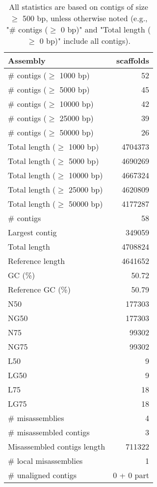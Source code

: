 \documentclass[12pt,a4paper]{article}
\begin{document}
\begin{table}[ht]
\begin{center}
\caption{All statistics are based on contigs of size $\geq$ 500 bp, unless otherwise noted (e.g., "\# contigs ($\geq$ 0 bp)" and "Total length ($\geq$ 0 bp)" include all contigs).}
\begin{tabular}{|l*{1}{|r}|}
\hline
Assembly & scaffolds \\ \hline
\# contigs ($\geq$ 1000 bp) & 52 \\ \hline
\# contigs ($\geq$ 5000 bp) & 45 \\ \hline
\# contigs ($\geq$ 10000 bp) & 42 \\ \hline
\# contigs ($\geq$ 25000 bp) & 39 \\ \hline
\# contigs ($\geq$ 50000 bp) & 26 \\ \hline
Total length ($\geq$ 1000 bp) & 4704373 \\ \hline
Total length ($\geq$ 5000 bp) & 4690269 \\ \hline
Total length ($\geq$ 10000 bp) & 4667324 \\ \hline
Total length ($\geq$ 25000 bp) & 4620809 \\ \hline
Total length ($\geq$ 50000 bp) & 4177287 \\ \hline
\# contigs & 58 \\ \hline
Largest contig & 349059 \\ \hline
Total length & 4708824 \\ \hline
Reference length & 4641652 \\ \hline
GC (\%) & 50.72 \\ \hline
Reference GC (\%) & 50.79 \\ \hline
N50 & 177303 \\ \hline
NG50 & 177303 \\ \hline
N75 & 99302 \\ \hline
NG75 & 99302 \\ \hline
L50 & 9 \\ \hline
LG50 & 9 \\ \hline
L75 & 18 \\ \hline
LG75 & 18 \\ \hline
\# misassemblies & 4 \\ \hline
\# misassembled contigs & 3 \\ \hline
Misassembled contigs length & 711322 \\ \hline
\# local misassemblies & 1 \\ \hline
\# unaligned contigs & 0 + 0 part \\ \hline

\end{tabular}
\end{center}
\end{table}
\end{document}
